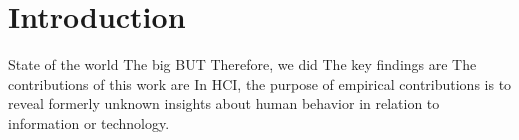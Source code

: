 \section{Introduction}

State of the world \newline
The big BUT\newline
Therefore, we did\newline
The key findings are\newline
The contributions of this work are\newline
In HCI, the purpose of empirical contributions is to reveal formerly unknown insights about human behavior in relation to information or technology.

